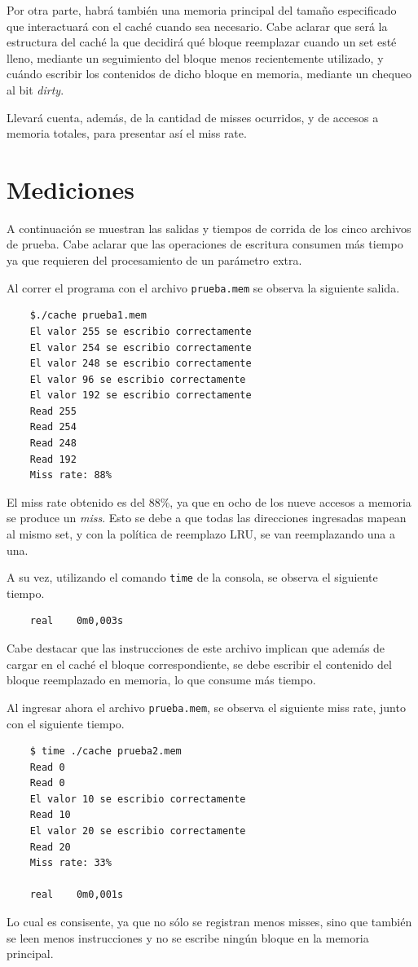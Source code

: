 \documentclass[a4paper, 12pt]{article}
\begin{document}
	Por otra parte, habrá también una memoria principal del tamaño especificado que interactuará con el caché cuando sea necesario. Cabe aclarar que será la estructura del caché la que decidirá qué bloque reemplazar cuando un set esté lleno, mediante un seguimiento del bloque menos recientemente utilizado, y cuándo escribir los contenidos de dicho bloque en memoria, mediante un chequeo al bit \textit{dirty}.
	
	Llevará cuenta, además, de la cantidad de misses ocurridos, y de accesos a memoria totales, para presentar así el miss rate.  
	\section{Mediciones}
	A continuación se muestran las salidas y tiempos de corrida de los cinco archivos de prueba. Cabe aclarar que las operaciones de escritura consumen más tiempo ya que requieren del procesamiento de un parámetro extra.
	
	Al correr el programa con el archivo \texttt{prueba.mem} se observa la siguiente salida.
	\begin{verbatim}
	$./cache prueba1.mem
	El valor 255 se escribio correctamente
	El valor 254 se escribio correctamente
	El valor 248 se escribio correctamente
	El valor 96 se escribio correctamente
	El valor 192 se escribio correctamente
	Read 255
	Read 254
	Read 248
	Read 192
	Miss rate: 88%
	\end{verbatim}
	El miss rate obtenido es del 88\%, ya que en ocho de los nueve accesos a memoria se produce un \textit{miss}. Esto se debe a que todas las direcciones ingresadas mapean al mismo set, y con la política de reemplazo LRU, se van reemplazando una a una.
	
	A su vez, utilizando el comando \texttt{time} de la consola, se observa el siguiente tiempo. 
	
	\begin{verbatim}
	real	0m0,003s
	\end{verbatim}
	Cabe destacar que las instrucciones de este archivo implican que además de cargar en el caché el bloque correspondiente, se debe escribir el contenido del bloque reemplazado en memoria, lo que consume más tiempo.
	
	Al ingresar ahora el archivo \texttt{prueba.mem}, se observa el siguiente miss rate, junto con el siguiente tiempo. 
	\begin{verbatim}
	$ time ./cache prueba2.mem
	Read 0
	Read 0
	El valor 10 se escribio correctamente
	Read 10
	El valor 20 se escribio correctamente
	Read 20
	Miss rate: 33%
	
	real	0m0,001s
	\end{verbatim}
	Lo cual es consisente, ya que no sólo se registran menos misses, sino que también se leen menos instrucciones y no se escribe ningún bloque en la memoria principal.
	
\end{document}
